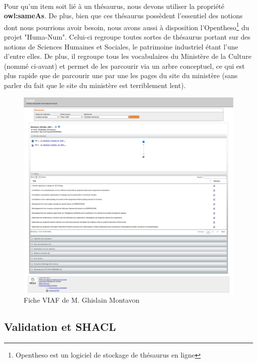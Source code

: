 \paragraph{} \hspace{10mm}
Pour qu'un item soit lié à un thésaurus, nous devons utiliser la propriété \textbf{owl:sameAs}. De plus, bien que ces thésaurus possèdent l'essentiel des notions dont nous pourrions avoir besoin, nous avons aussi à disposition l'Opentheso\footnote{Opentheso est un logiciel de stockage de thésaurus en ligne} du projet "Huma-Num". Celui-ci regroupe toutes sortes de thésaurus portant sur des notions de Sciences Humaines et Sociales, le patrimoine industriel étant l'une d'entre elles. De plus, il regroupe tous les vocabulaires du Ministère de la Culture (nommé ci-avant) et permet de les parcourir via un arbre conceptuel, ce qui est plus rapide que de parcourir une par une les pages du site du ministère (sans parler du fait que le site du ministère est terriblement lent).  

\begin{figure} [H]
    \centering
    \includegraphics[width=1\textwidth]{assets/thesaurus/screen_viaf_ghis.png}
    \caption{Fiche VIAF de M. Ghislain Montavon}
    \label{fig:viafGhis}
\end{figure}

\subsection{Validation et SHACL}

